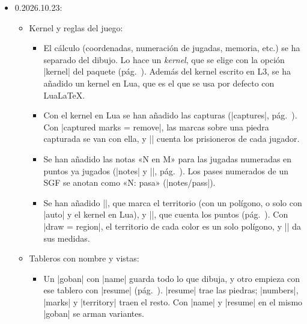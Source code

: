 \begin{itemize}
\begin{itemize}
$$			\item En español, los colores van en singular y el resultado concuerda también con un nombre: «Gana Negro», «Juega Blanco», «Gana Ana por abandono». En portugués, «Vitória de Ana».
			\item |\pgfgostone|: una piedra sola en el texto, sin tablero, con marca o con número (|\pgfgostone[b, number = 5]|, pág.~\pageref{subsec:piedra-texto}).
			\item |\pgfgoview| con varias partes (|{F15, G15, C3:E5}|): una vista por parte, unidas con |view/separator| y |view/last| («y» o su traducción, pág.~\pageref{subsec:vistas}).
		\end{itemize}
	\item 0.2026.10.23:
		\begin{itemize}
			\item Kernel y reglas del juego:
				\begin{itemize}
					\item El cálculo (coordenadas, numeración de jugadas, memoria, etc.) se ha separado del dibujo. Lo hace un \emph{kernel}, que se elige con la opción |kernel| del paquete (pág.~\pageref{subsec:kernel}). Además del kernel escrito en L3, se ha añadido un kernel en Lua, que es el que se usa por defecto con Lua\LaTeX.
					\item Con el kernel en Lua se han añadido las capturas (|captures|, pág.~\pageref{subsec:capturas}). Con |captured marks = remove|, las marcas sobre una piedra capturada se van con ella, y |\pgfgoprisoners| cuenta los prisioneros de cada jugador.
					\item Se han añadido las notas «N en M» para las jugadas numeradas en puntos ya jugados (|notes| y |\pgfgomovenotes|, pág.~\pageref{subsec:notas}). Los pases numerados de un SGF se anotan como «N: pasa» (|notes/pass|).
					\item Se han añadido |\territory|, que marca el territorio (con un polígono, o solo con |auto| y el kernel en Lua), y |\pgfgoscore|, que cuenta los puntos (pág.~\pageref{subsec:territorio}). Con |draw = region|, el territorio de cada color es un solo polígono, y |\pgfgoregion| da sus medidas.
				\end{itemize}
			\item Tableros con nombre y vistas:
				\begin{itemize}
					\item Un |goban| con |name| guarda todo lo que dibuja, y otro empieza con ese tablero con |resume| (pág.~\pageref{subsec:recordar}). |resume| trae las piedras; |numbers|, |marks| y |territory| traen el resto. Con |name| y |resume| en el mismo |goban| se arman variantes.

\end{itemize}
\end{itemize}
\end{itemize}
